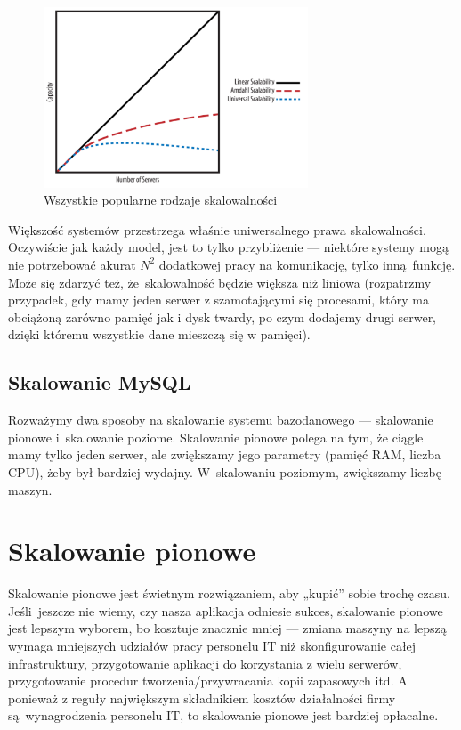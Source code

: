 \documentclass[a4paper,12pt]{article}
\begin{document}
\begin{figure}[ht]
\centering
\includegraphics[width=0.7\textwidth]{scaling-all.png}
\caption{Wszystkie popularne rodzaje skalowalności}
\label{fig:scaling-all}
\end{figure}


Większość systemów przestrzega właśnie uniwersalnego prawa skalowalności. Oczywiście jak każdy model, jest to tylko przybliżenie --- niektóre systemy mogą nie potrzebować akurat $N^2$ dodatkowej pracy na komunikację, tylko inną funkcję. Może się zdarzyć też, że~skalowalność będzie większa niż liniowa (rozpatrzmy przypadek, gdy mamy jeden serwer z szamotającymi się procesami, który ma obciążoną zarówno pamięć jak i dysk twardy, po czym dodajemy drugi serwer, dzięki któremu wszystkie dane mieszczą się w pamięci).

\subsection{Skalowanie MySQL}

Rozważymy dwa sposoby na skalowanie systemu bazodanowego --- skalowanie pionowe i~skalowanie poziome. Skalowanie pionowe polega na tym, że ciągle mamy tylko jeden serwer, ale zwiększamy jego parametry (pamięć RAM, liczba CPU), żeby był bardziej wydajny. W~skalowaniu poziomym, zwiększamy liczbę maszyn.

\section{Skalowanie pionowe}

Skalowanie pionowe jest świetnym rozwiązaniem, aby „kupić” sobie trochę czasu. Jeśli~jeszcze nie wiemy, czy nasza aplikacja odniesie sukces, skalowanie pionowe jest lepszym wyborem, bo kosztuje znacznie mniej --- zmiana maszyny na lepszą wymaga mniejszych udziałów pracy personelu IT niż skonfigurowanie całej infrastruktury, przygotowanie aplikacji do korzystania z wielu serwerów, przygotowanie procedur tworzenia/przywracania kopii zapasowych itd. A ponieważ z reguły największym składnikiem kosztów działalności firmy są wynagrodzenia personelu IT, to skalowanie pionowe jest bardziej opłacalne.
\end{document}
